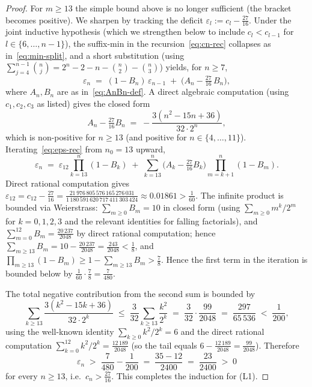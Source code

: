 \documentclass{article}
\theoremstyle{remark}
\begin{document}
\begin{proof}
For $m\ge 13$ the simple bound above is no longer sufficient
(the bracket becomes positive). We sharpen by tracking the deficit
$\varepsilon_{l}:=c_{l}-\tfrac{27}{16}$. Under the joint inductive
hypothesis (which we strengthen below to include $c_{l}<c_{l-1}$
for $l\in\{6,\dots,n-1\}$), the suffix-min in the
recursion~\eqref{eq:cn-rec} collapses as in~\eqref{eq:min-split}, and a
short substitution (using $\sum_{j=4}^{n-1}\binom{n}{j}=2^{n}-2-n-\binom{n}{2}-\binom{n}{3}$)
yields, for $n\ge 7$,
\begin{equation}\label{eq:eps-rec}
  \varepsilon_{n}\;=\;(1-B_{n})\,\varepsilon_{n-1}\;+\;\bigl(A_{n}-\tfrac{27}{16}\,B_{n}\bigr),
\end{equation}
where $A_{n},B_{n}$ are as in~\eqref{eq:AnBn-def}.
A direct algebraic computation (using $c_{1},c_{2},c_{3}$ as listed)
gives the closed form
\begin{equation}\label{eq:An-Bn-id}
  A_{n}-\tfrac{27}{16}B_{n}\;=\;-\frac{3(n^{2}-15n+36)}{32\cdot 2^{n}},
\end{equation}
which is non-positive for $n\ge 13$ (and positive for
$n\in\{4,\dots,11\}$). Iterating~\eqref{eq:eps-rec} from $n_{0}=13$
upward,
\[
  \varepsilon_{n}\;=\;\varepsilon_{12}\!\!\prod_{k=13}^{n}\!(1-B_{k})\;+\;\sum_{k=13}^{n}\bigl(A_{k}-\tfrac{27}{16}B_{k}\bigr)\!\!\prod_{m=k+1}^{n}\!(1-B_{m}).
\]
Direct rational computation gives
$\varepsilon_{12}=c_{12}-\tfrac{27}{16}=\tfrac{21\,976\,805\,576\,165\,276\,031}{1\,180\,591\,620\,717\,411\,303\,424}\approx 0.01861>\tfrac{1}{60}$.
The infinite product is bounded via Weierstrass:
$\sum_{m\ge 0}B_{m}=10$ in closed form (using
$\sum_{m\ge 0}m^{k}/2^{m}$ for $k=0,1,2,3$ and the relevant identities
for falling factorials), and
$\sum_{m=0}^{12}B_{m}=\tfrac{20\,237}{2048}$ by direct rational
computation; hence
$\sum_{m\ge 13}B_{m}=10-\tfrac{20\,237}{2048}=\tfrac{243}{2048}<\tfrac{1}{8}$,
and $\prod_{m\ge 13}(1-B_{m})\ge 1-\sum_{m\ge 13}B_{m}>\tfrac{7}{8}$.
Hence the first term in the iteration is bounded below by
$\tfrac{1}{60}\cdot\tfrac{7}{8}=\tfrac{7}{480}$.

The total negative contribution from the second sum is bounded by
\[
  \sum_{k\ge 13}\frac{3(k^{2}-15k+36)}{32\cdot 2^{k}}\;\le\;\frac{3}{32}\sum_{k\ge 13}\frac{k^{2}}{2^{k}}\;=\;\frac{3}{32}\cdot\frac{99}{2048}\;=\;\frac{297}{65\,536}\;<\;\frac{1}{200},
\]
using the well-known identity $\sum_{k\ge 0}k^{2}/2^{k}=6$ and the
direct rational computation
$\sum_{k=0}^{12}k^{2}/2^{k}=\tfrac{12\,189}{2048}$ (so the tail equals
$6-\tfrac{12\,189}{2048}=\tfrac{99}{2048}$). Therefore
\[
  \varepsilon_{n}\;>\;\frac{7}{480}-\frac{1}{200}\;=\;\frac{35-12}{2400}\;=\;\frac{23}{2400}\;>\;0
\]
for every $n\ge 13$, i.e.\ $c_{n}>\tfrac{27}{16}$. This completes the
induction for (L1).


\end{proof}
\end{document}
